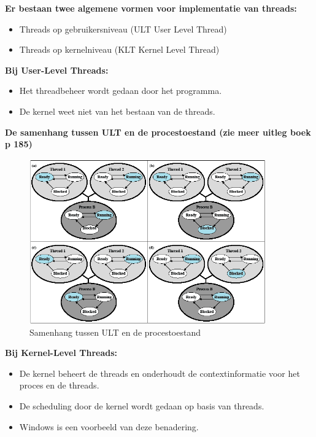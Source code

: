 \textbf{Er bestaan twee algemene vormen voor implementatie van threads:}

\begin{itemize}
\item Threads op gebruikersniveau (ULT User Level Thread)
\item Threads op kernelniveau (KLT Kernel Level Thread)
\end{itemize}

\textbf{Bij User-Level Threads:}

\begin{itemize}
        \item Het threadbeheer wordt gedaan door het programma.
        \item De kernel weet niet van het bestaan van de threads.
\end{itemize}

\textbf{De samenhang tussen ULT en de procestoestand (zie meer uitleg boek p 185)}

\begin{figure}[htp]
    \centering
            \includegraphics[width=4in]{img/samenhangultprocestoestand.png}
        \caption{Samenhang tussen ULT en de procestoestand}
    \label{fig:Samenhang tussen ULT en de procestoestand}
\end{figure}

\textbf{Bij Kernel-Level Threads:}

\begin{itemize}
    \item De kernel beheert de threads en onderhoudt de contextinformatie voor het proces en de threads.
    \item De scheduling door de kernel wordt gedaan op basis van threads.
        
    \item Windows is een voorbeeld van deze benadering.
\end{itemize}
	
